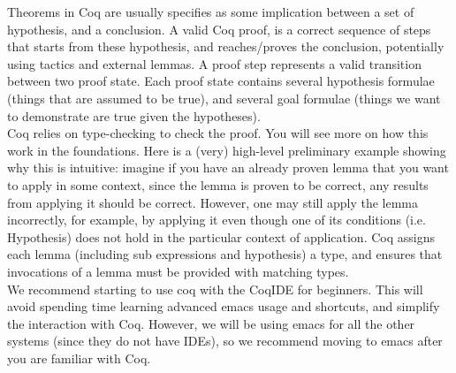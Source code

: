 \documentclass{article}
\begin{document}
Theorems in Coq are usually specifies as some implication between a set of hypothesis, and a conclusion. A valid Coq proof, is a correct sequence of steps that starts from these hypothesis, and reaches/proves the conclusion, potentially using tactics and external lemmas. A proof step represents a valid transition between two proof state. Each proof state contains several hypothesis formulae (things that are assumed to be true), and several goal formulae (things we want to demonstrate are true given the hypotheses). \\

Coq relies on type-checking to check the proof. You will see more on how this work in the foundations. Here is a (very) high-level preliminary example showing why this is intuitive: imagine if you have an already proven lemma that you want to apply in some context, since the lemma is proven to be correct, any results from applying it should be correct. However, one may still apply the lemma incorrectly, for example, by applying it even though one of its conditions (i.e. Hypothesis) does not hold in the particular context of application. Coq assigns each lemma (including sub expressions and hypothesis) a type, and ensures that invocations of a lemma must be provided with matching types. \\

We recommend starting to use coq with the CoqIDE for beginners. This will avoid spending time learning advanced emacs usage and shortcuts, and simplify the interaction with Coq. However,
we will be using emacs for all the other systems (since they do not have IDEs), so we recommend moving to emacs after you are familiar with Coq.
\end{document}
